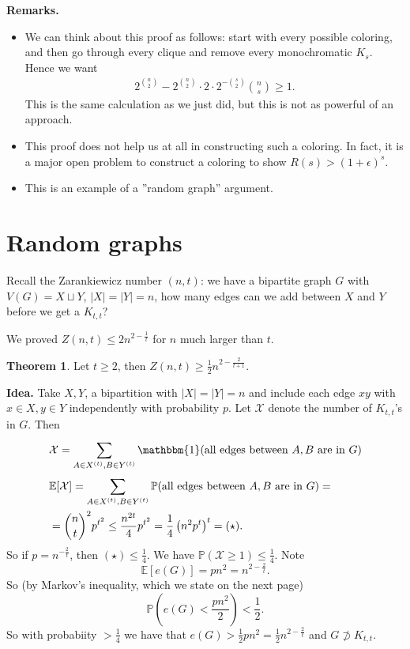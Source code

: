 \documentclass{article}
\theoremstyle{definition}
\newtheorem{theorem}{Theorem}[section]
\begin{document}
\textbf{Remarks.}
\begin{itemize}
    \item We can think about this proof as follows: start with every possible coloring, and then go through every clique and remove every monochromatic $K_s$. Hence we want
    \begin{align*}
        2^{{n}\choose{2}} - 2^{{n}\choose{2}}\cdot 2\cdot 2^{-{{s}\choose{2}}} {{n}\choose{s}}\ge 1.
    \end{align*}
    This is the same calculation as we just did, but this is not as powerful of an approach.
    \item This proof does not help us at all in constructing such a coloring. In fact, it is a major open problem to construct a coloring to show $R(s)>(1+\epsilon)^s$.
    \item This is an example of a ''random graph'' argument.
\end{itemize} 

\section{Random graphs}

Recall the Zarankiewicz number $(n,t)$: we have a bipartite graph $G$ with $V(G)=X \sqcup Y$, $|X|=|Y|=n$, how many edges can we add between $X$ and $Y$ before we get a $K_{t,t}$?

We proved $Z(n,t)\le 2 n^{2-\frac{1}{t}}$ for $n$ much larger than $t$.

\begin{theorem}
    Let $t\ge 2$, then $Z(n,t)\ge \frac{1}{2}n^{2-\frac{2}{t+1}}$.
\end{theorem}
\textbf{Idea.} Take $X,Y$, a bipartition with $|X|=|Y|=n$ and include each edge $xy$ with $x \in X, y \in Y$ independently with probability $p$. Let $\mathcal{X}$ denote the number of $K_{t,t}$'s in $G$. Then 
\begin{align*}
    &\mathcal{X} = \sum_{A \in X^{(t)}, B \in Y^{(t)}}^{} \mathbbm{1}(\text{all edges between }A,B \text{ are in }G) \\
    &\mathbb{E}[\mathcal{X}] = \sum_{A \in X^{(t)}, B \in Y^{(t)}}^{} \mathbb{P}(\text{all edges between }A,B \text{ are in }G) = \\
    &={{n}\choose{t}}^2 p^{t^2} \le \frac{n^{2t}}{4} p^{t^2} = \frac{1}{4}\left(n^2 p^t\right)^t = (\star).
\end{align*} 
So if $p = n^{-\frac{2}{t}}$, then $(\star)\le \frac{1}{4}$. We have $\mathbb{P}(\mathcal{X}\ge 1)\le \frac{1}{4}$. Note $$\mathbb{E}[e(G)]=pn^2 = n^{2-\frac{2}{t}}.$$
So (by Markov's inequality, which we state on the next page)\[
\mathbb{P}\left(e(G)<\frac{pn^2}{2}\right) < \frac{1}{2}.
\]
So with probabiity $>\frac{1}{4}$ we have that $e(G)>\frac{1}{2} pn^2 = \frac{1}{2}n^{2-\frac{2}{t}}$ and $G \not\supset K_{t,t}$.
\end{document}
